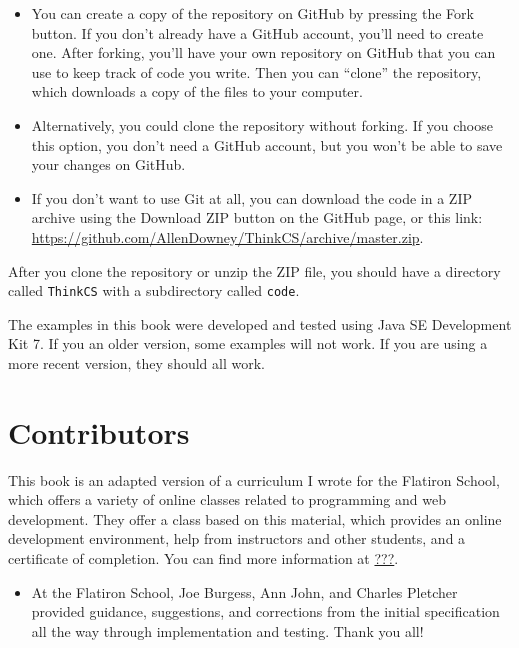\documentclass[12pt]{book}
\theoremstyle{exercise}
\begin{document}
\begin{itemize}

\item You can create a copy of the repository on GitHub by pressing
  the {\sf Fork} button.  If you don't already have a GitHub account,
  you'll need to create one.  After forking, you'll have your own
  repository on GitHub that you can use to keep track of code you
  write.  Then you can ``clone'' the repository, which downloads a
  copy of the files to your computer.

\item Alternatively, you could clone the repository without forking.
  If you choose this option, you don't need a GitHub account, but you
  won't be able to save your changes on GitHub.

\item If you don't want to use Git at all, you can download the code
  in a ZIP archive using the {\sf Download ZIP} button on the GitHub
  page, or this link:
  \url{https://github.com/AllenDowney/ThinkCS/archive/master.zip}.


\end{itemize}

After you clone the repository or unzip the ZIP file, you should have
a directory called {\tt ThinkCS} with a subdirectory called {\tt code}.

The examples in this book were developed and tested using Java SE
Development Kit 7.  If you an older version, some examples will not
work.  If you are using a more recent version, they should all work.


\section*{Contributors}

This book is an adapted version of a curriculum I wrote for the
Flatiron School, which offers a variety of online classes related
to programming and web development.  They offer a class based
on this material, which provides an online development environment,
help from instructors and other students, and a certificate of
completion.  You can find more information at \url{???}.


\begin{itemize}


\item At the Flatiron School, Joe Burgess, Ann John, and Charles
Pletcher provided guidance, suggestions, and corrections from the
initial specification all the way through implementation and testing.
Thank you all!


\end{itemize}
\end{document}
